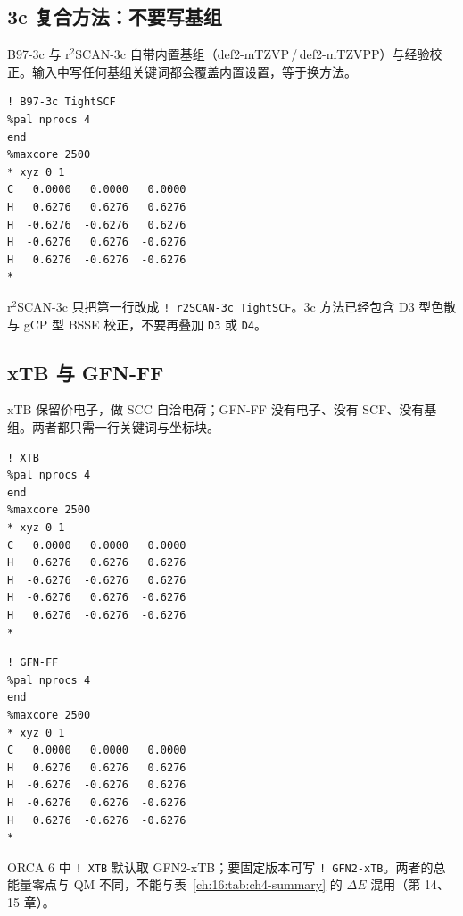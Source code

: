 \subsection{3c 复合方法：不要写基组}

B97-3c 与 r$^2$SCAN-3c 自带内置基组（def2-mTZVP\,/\,def2-mTZVPP）与经验校正。输入中写任何基组关键词都会覆盖内置设置，等于换方法。
\begin{lstlisting}
! B97-3c TightSCF
%pal nprocs 4
end
%maxcore 2500
* xyz 0 1
C   0.0000   0.0000   0.0000
H   0.6276   0.6276   0.6276
H  -0.6276  -0.6276   0.6276
H  -0.6276   0.6276  -0.6276
H   0.6276  -0.6276  -0.6276
*
\end{lstlisting}
r$^2$SCAN-3c 只把第一行改成 \texttt{! r2SCAN-3c TightSCF}。3c 方法已经包含 D3 型色散与 gCP 型 BSSE 校正，不要再叠加 \texttt{D3} 或 \texttt{D4}。

\subsection{xTB 与 GFN-FF}

xTB 保留价电子，做 SCC 自洽电荷；GFN-FF 没有电子、没有 SCF、没有基组。两者都只需一行关键词与坐标块。
\begin{lstlisting}
! XTB
%pal nprocs 4
end
%maxcore 2500
* xyz 0 1
C   0.0000   0.0000   0.0000
H   0.6276   0.6276   0.6276
H  -0.6276  -0.6276   0.6276
H  -0.6276   0.6276  -0.6276
H   0.6276  -0.6276  -0.6276
*
\end{lstlisting}
\begin{lstlisting}
! GFN-FF
%pal nprocs 4
end
%maxcore 2500
* xyz 0 1
C   0.0000   0.0000   0.0000
H   0.6276   0.6276   0.6276
H  -0.6276  -0.6276   0.6276
H  -0.6276   0.6276  -0.6276
H   0.6276  -0.6276  -0.6276
*
\end{lstlisting}
ORCA 6 中 \texttt{! XTB} 默认取 GFN2-xTB；要固定版本可写 \texttt{! GFN2-xTB}。两者的总能量零点与 QM 不同，不能与表~\ref{ch:16:tab:ch4-summary} 的 $\Delta E$ 混用（第 14、15 章）。

\lstset{style=orca}
